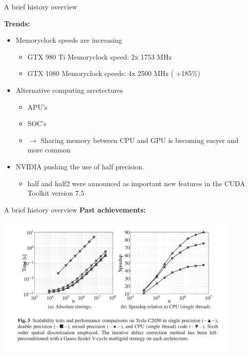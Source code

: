 \documentclass[10pt]{beamer}
\begin{document}
\begin{frame}{A brief history overview}

\textbf{Trends:}\\
\begin{itemize}
  \item Memoryclock speeds are increasing\\
  \begin{itemize}
    \item GTX 980 Ti Memoryclock speed: 2x 1753 MHz
    \item GTX 1080 Memoryclock speeds: 4x 2500 MHz (\color{red} +185\%\color{black})
  \end{itemize}
  \item Alternative computing arcetectures\\
  \begin{itemize}
    \item APU's
    \item SOC's
    \item $\rightarrow$ Sharing memory between CPU and GPU is becoming easyer and more common
  \end{itemize}
  \item NVIDIA pushing the use of half precision. 
  \begin{itemize}
   \item half and half2 were announced as important new features in the CUDA Toolkit version 7.5
  \end{itemize}
\end{itemize}
\end{frame}

\begin{frame}{A brief history overview}
 \textbf{Past achievements:}~\\
\begin{center}
  \includegraphics[width=0.9\textwidth]{../SourcesCites/past.jpg}
\end{center}

 
\end{frame}
\end{document}
